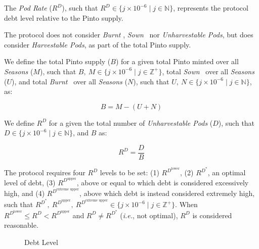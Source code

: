 \documentclass[tikz]{article}
\makeatletter
\newenvironment{keepunit}{%
  \par\penalty0\begingroup
  \edef\keepunitparskip{\the\parskip}%
  \noindent\begin{minipage}[t]{\linewidth}%
  \setlength{\parskip}{\keepunitparskip}%
  \@minipagefalse
}{%
  \end{minipage}\par\endgroup
}
\newcommand{\term}[1]{\textsl{#1}}
\newcommand{\Pinto}{} %
\renewcommand{\Pinto}{\usebox{\cachePinto}}
\makeatother
\begin{document}
The \term{Pod Rate} ($R^{D}$), such that $R^{D} \in \{j \times 10^{-6} \mid j \in \mathbb{N} \}$, represents the protocol debt level relative to the Pinto supply.

The protocol does not consider \term{Burnt} \Pinto, \term{Sown} \Pinto\  nor \term{Unharvestable Pods}, but does consider \term{Harvestable Pods}, as part of the total Pinto supply.

\begin{keepunit}
We define the total Pinto supply ($B$) for a given total Pinto minted over all \term{Seasons} ($M$), such that $B,\ M \in \{j \times 10^{-6} \mid j \in \mathbb{Z}^{+} \}$, total \term{Sown} \Pinto\ over all \term{Seasons} ($U$), and total \term{Burnt} \Pinto\ over all \term{Seasons} ($N$), such that $U,\ N \in \{j \times 10^{-6} \mid j \in \mathbb{N} \}$, as:

    $$
        B = M - (U + N)
    $$
\end{keepunit}

\begin{keepunit}
We define $R^{D}$ for a given the total number of \term{Unharvestable Pods} ($D$), such that $D \in \{j \times 10^{-6} \mid j \in \mathbb{N} \}$, and $B$ as:

    $$
        R^{D} = \frac{D}{B}
    $$
\end{keepunit}



\begin{keepunit}
The protocol requires four $R^{D}$ levels to be set: (1) $R^{D^{\text{lower}}}$, (2) $R^{D^{*}}$, an optimal level of debt, (3) $R^{D^{\text{upper}}}$, above or equal to which debt is considered excessively high, and (4) $R^{D^{\text{extreme upper}}}$, above which debt is instead considered extremely high, such that $R^{D^{*}},\ R^{D^{\text{upper}}},\ R^{D^{\text{extreme upper}}} \in \{j \times 10^{-6} \mid j \in \mathbb{Z}^{+} \}$. When $R^{D^{\text{lower}}} \leq R^{D} < R^{D^{\text{upper}}}$ and $R^{D} \neq R^{D^{*}}$ (\textit{i.e.}, not optimal), $R^{D}$ is considered reasonable.


\begin{figure}[H]
    \centering
    
    \vspace*{-7mm}
    \setlength{\belowcaptionskip}{-8pt} %
    \caption{Debt Level}
    \label{Debt Level}
\end{figure}
\end{keepunit}
\end{document}
